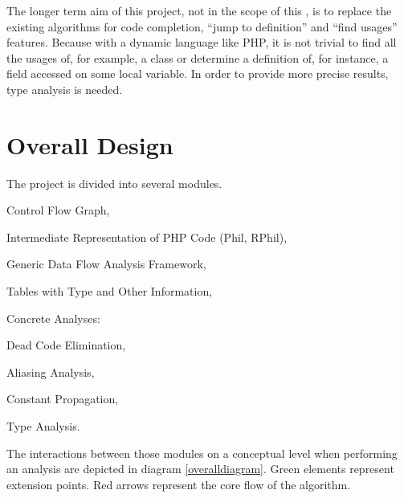     The longer term aim of this project, not in the scope 
    of this \wthesis{}, is to replace the existing 
    algorithms for code completion, ``jump to definition'' 
    and ``find usages'' features. Because 
    with a dynamic language like PHP, it is not trivial to 
    find all the usages of, for example, a class or determine 
    a definition of, for instance, a field accessed 
    on some local variable. In order to provide more 
    precise results, type analysis is needed.
    
    \section{Overall Design}
    \label{overalldesign}
    
    The project is divided into several modules.
    \begin{itemize*}
        \item Control Flow Graph,
        \item Intermediate Representation of PHP Code (Phil, RPhil),
        \item Generic Data Flow Analysis Framework, 
        \item Tables with Type and Other Information, 
        \item Concrete Analyses:
        \begin{itemize*}
            \item Dead Code Elimination, 
            \item Aliasing Analysis, 
            \item Constant Propagation,
            \item Type Analysis.
        \end{itemize*}
    \end{itemize*}
    
    The interactions between those modules on a conceptual level 
    when performing an analysis are depicted in diagram \ref{overalldiagram}. 
    Green elements represent extension points. Red arrows represent the 
    core flow of the algorithm.

